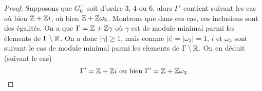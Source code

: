 \begin{proof}
	Supposons que $G_0^+$ soit d'ordre 3, 4 ou 6, alors $\Gamma'$
	contient suivant les cas où bien $\mathbb{Z} + \mathbb{Z} i$, où bien $\mathbb{Z} + \mathbb{Z}\omega_3$.
	Montrons que dans ces cas, ces inclusions sont des égalités.
	On a que $\Gamma = \mathbb{Z} + \mathbb{Z}\gamma$ où $\gamma$ est de module minimal parmi les
	élements de $\Gamma \setminus \mathbb{R}$. On a donc $|\gamma| \geq 1$, mais comme
	$|i| = |\omega_3| = 1$, $i$ et $\omega_3$ sont suivant le cas de module
	minimal parmi les elements de $\Gamma \setminus \mathbb{R}$.
	On en déduit (suivant le cas)
	\begin{equation*}
		\Gamma' = \mathbb{Z} + \mathbb{Z} i \textrm{ ou bien } \Gamma' = \mathbb{Z} + \mathbb{Z}\omega_3
	\end{equation*}



\end{proof}

